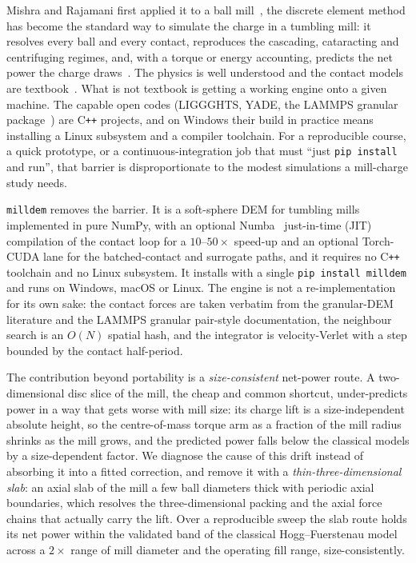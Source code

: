 \documentclass[journal]{IEEEtran}
\begin{document}
 Mishra and Rajamani first applied it to a ball mill~\cite{mishra}, the discrete element
method has become the standard way to simulate the charge in a tumbling mill: it resolves every ball and every
contact, reproduces the cascading, cataracting and centrifuging regimes, and, with a torque or energy accounting,
predicts the net power the charge draws~\cite{cleary,vannierop,govender,weerasekara}. The physics is well
understood and the contact models are textbook~\cite{cundall,tsuji,golpayegani}. What is not textbook is getting a
working engine onto a given machine. The capable open codes (LIGGGHTS, YADE, the LAMMPS granular
package~\cite{lammps}) are C\texttt{++} projects, and on Windows their build in practice means installing a Linux
subsystem and a compiler toolchain. For a reproducible course, a quick prototype, or a continuous-integration job
that must ``just \texttt{pip install} and run'', that barrier is disproportionate to the modest simulations a
mill-charge study needs.

\texttt{milldem} removes the barrier. It is a soft-sphere DEM for tumbling mills implemented in pure
NumPy, with an optional Numba~\cite{numba} just-in-time (JIT) compilation of the contact loop for a $10$--$50\times$ speed-up
and an optional Torch-CUDA lane for the batched-contact and surrogate paths, and it requires no C\texttt{++}
toolchain and no Linux subsystem. It installs with a single \texttt{pip install milldem} and runs on Windows,
macOS or Linux. The engine is not a re-implementation for its own sake: the contact forces are taken verbatim
from the granular-DEM literature and the LAMMPS granular pair-style documentation, the neighbour search is an
$O(N)$ spatial hash, and the integrator is velocity-Verlet with a step bounded by the contact half-period.

The contribution beyond portability is a \emph{size-consistent} net-power route. A two-dimensional disc slice of
the mill, the cheap and common shortcut, under-predicts power in a way that gets worse with mill size: its charge
lift is a size-independent absolute height, so the centre-of-mass torque arm as a fraction of the mill radius
shrinks as the mill grows, and the predicted power falls below the classical models by a size-dependent factor.
We diagnose the cause of this drift instead of absorbing it into a fitted correction, and remove it with a
\emph{thin-three-dimensional slab}: an axial
slab of the mill a few ball diameters thick with periodic axial boundaries, which resolves the three-dimensional
packing and the axial force chains that actually carry the lift. Over a reproducible sweep the slab route holds
its net power within the validated band of the classical Hogg--Fuerstenau model~\cite{hf} across a $2\times$ range
of mill diameter and the operating fill range, size-consistently.
\end{document}
